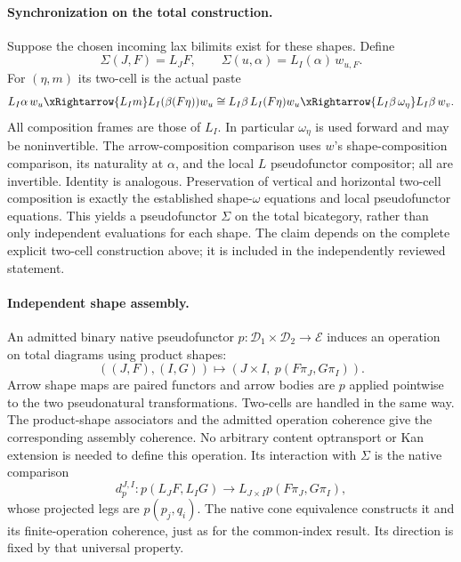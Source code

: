 \documentclass{article}
\begin{document}
\paragraph{Synchronization on the total construction.} Suppose the chosen incoming lax bilimits exist for these shapes. Define
\[
 \Sigma(J,F)=L_JF,\qquad
 \Sigma(u,\alpha)=L_I(\alpha)\,w_{u,F}.
\]
For $(\eta,m)$ its two-cell is the actual paste
\[
 L_I\alpha\,w_u\xRightarrow{L_Im}
 L_I(\beta(F\eta))w_u
 \cong L_I\beta\,L_I(F\eta)w_u
 \xRightarrow{L_I\beta\,\omega_\eta}L_I\beta\,w_v.
\]
All composition frames are those of $L_I$. In particular $\omega_\eta$ is used forward and may be noninvertible. The arrow-composition comparison uses $w$'s shape-composition comparison, its naturality at $\alpha$, and the local $L$ pseudofunctor compositor; all are invertible. Identity is analogous. Preservation of vertical and horizontal two-cell composition is exactly the established shape-$\omega$ equations and local pseudofunctor equations. This yields a pseudofunctor $\Sigma$ on the total bicategory, rather than only independent evaluations for each shape. The claim depends on the complete explicit two-cell construction above; it is included in the independently reviewed statement.

\paragraph{Independent shape assembly.} An admitted binary native pseudofunctor $p:\mathcal D_1\times\mathcal D_2\to\mathcal E$ induces an operation on total diagrams using product shapes:
\[
 ((J,F),(I,G))\longmapsto
 (J\times I,\ p(F\pi_J,G\pi_I)).
\]
Arrow shape maps are paired functors and arrow bodies are $p$ applied pointwise to the two pseudonatural transformations. Two-cells are handled in the same way. The product-shape associators and the admitted operation coherence give the corresponding assembly coherence. No arbitrary content optransport or Kan extension is needed to define this operation. Its interaction with $\Sigma$ is the native comparison
\[
 d^{J,I}_p:p(L_JF,L_IG)\longrightarrow
 L_{J\times I}p(F\pi_J,G\pi_I),
\]
whose projected legs are $p(p_j,q_i)$. The native cone equivalence constructs it and its finite-operation coherence, just as for the common-index result. Its direction is fixed by that universal property.
\end{document}

